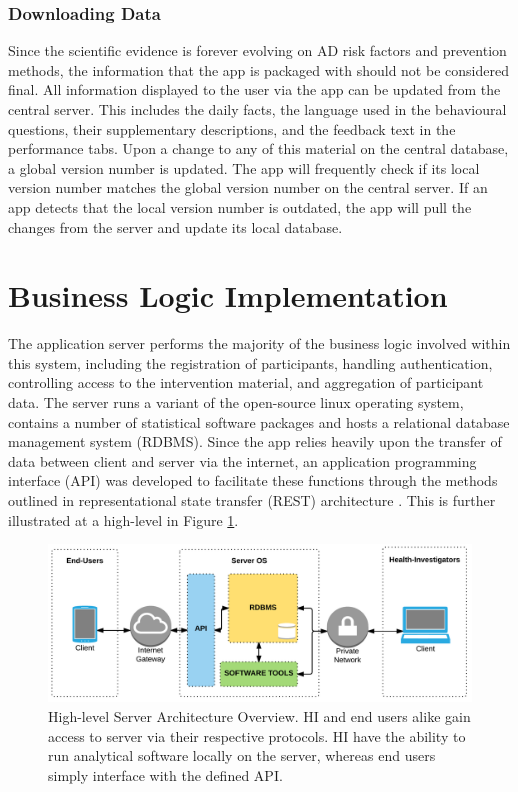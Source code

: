 \subsubsection{Downloading Data}
Since the scientific evidence is forever evolving on AD risk factors and prevention methods, the information that the app is packaged with should not be considered final. All information displayed to the user via the app can be updated from the central server. This includes the daily facts, the language used in the behavioural questions, their supplementary descriptions, and the feedback text in the performance tabs. Upon a change to any of this material on the central database, a global version number is updated. The app will frequently check if its local version number matches the global version number on the central server. If an app detects that the local version number is outdated, the app will pull the changes from the server and update its local database.

\section{Business Logic Implementation}
The application server performs the majority of the business logic involved within this system, including the registration of participants, handling authentication, controlling access to the intervention material, and aggregation of participant data. The server runs a variant of the open-source linux operating system, contains a number of statistical software packages and hosts a relational database management system (RDBMS). Since the app relies heavily upon the transfer of data between client and server via the internet, an application programming interface (API) was developed to facilitate these functions through the methods outlined in representational state transfer (REST) architecture \cite{Fielding2000, Benslimane2008}. This is further illustrated at a high-level in Figure \ref{fig: clientserver-model-detail}.

\begin{figure}[h]
    \centering
    \includegraphics[scale=0.9, angle=0]{Files/prevention-study-1/figures/client-server-adapted}
    \caption{High-level Server Architecture Overview. HI and end users alike gain access to server via their respective protocols. HI have the ability to run analytical software locally on the server, whereas end users simply interface with the defined API.}
    \label{fig: clientserver-model-detail}
\end{figure}


